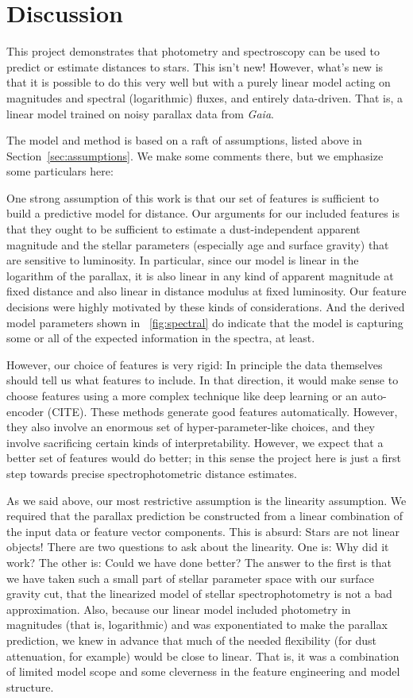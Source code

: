 \documentclass[modern]{aastex62}
\newcommand{\sectionname}{Section}
\newcommand{\project}[1]{\textsl{#1}}
\newcommand{\gaia}{\project{Gaia}}
\begin{document}
\section{Discussion}

This project demonstrates that photometry and spectroscopy can be used to predict
or estimate distances to stars.
This isn't new!
However, what's new is that it is possible to do this very well but with a purely
linear model acting on magnitudes and spectral (logarithmic) fluxes, and entirely
data-driven.
That is, a linear model trained on noisy parallax data from \gaia.

The model and method is based on a raft of assumptions, listed above
in \sectionname~\ref{sec:assumptions}.
We make some comments there, but we emphasize some particulars here:

One strong assumption of this work is that our set of features is sufficient to
build a predictive model for distance.
Our arguments for our included features is that they ought to be sufficient to
estimate a dust-independent apparent magnitude and the stellar parameters (especially
age and surface gravity) that are sensitive to luminosity.
In particular, since our model is linear in the logarithm of the parallax, it is
also linear in any kind of apparent magnitude at fixed distance and also linear
in distance modulus at fixed luminosity.
Our feature decisions were highly motivated by these kinds of considerations.
And the derived model parameters shown in \figurename~\ref{fig:spectral} do indicate that
the model is capturing some or all of the expected information in the spectra, at least.

However, our choice of features is very rigid:
In principle the data themselves should tell us what features to include.
In that direction, it would make sense to choose features using a more complex
technique like deep learning or an auto-encoder (CITE).
These methods generate good features automatically.
However, they also involve an enormous set of hyper-parameter-like choices,
and they involve sacrificing certain kinds of interpretability.
However, we expect that a better set of features would do better; in this sense
the project here is just a first step towards precise spectrophotometric distance
estimates.

As we said above, our most restrictive assumption is the linearity assumption.
We required that the parallax prediction be constructed from a linear combination
of the input data or feature vector components.
This is absurd: Stars are not linear objects!
There are two questions to ask about the linearity.
One is: Why did it work? The other is: Could we have done better?
The answer to the first is that we have taken such a small part of stellar parameter
space with our surface gravity cut, that the linearized model of stellar
spectrophotometry is not a bad approximation.
Also, because our linear model included photometry in magnitudes (that is, logarithmic)
and was exponentiated to make the parallax prediction, we knew in advance that much
of the needed flexibility (for dust attenuation, for example) would be close to
linear.
That is, it was a combination of limited model scope and some cleverness in the
feature engineering and model structure.
\end{document}
